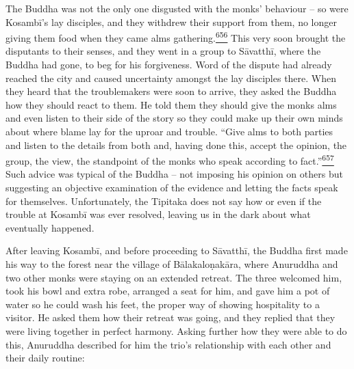 The Buddha was not the only one disgusted with the monks' behaviour --
so were Kosambī's lay disciples, and they withdrew their support from
them, no longer giving them food when they came alms
gathering.\label{footprints_split_016.html_fnref656}\hyperref[footprints_split_025.htmlux5cux23fn656]{\textsuperscript{656}}
This very soon brought the disputants to their senses, and they went in
a group to Sāvatthī, where the Buddha had gone, to beg for his
forgiveness. Word of the dispute had already reached the city and caused
uncertainty amongst the lay disciples there. When they heard that the
troublemakers were soon to arrive, they asked the Buddha how they should
react to them. He told them they should give the monks alms and even
listen to their side of the story so they could make up their own minds
about where blame lay for the uproar and trouble. ``Give alms to both
parties and listen to the details from both and, having done this,
accept the opinion, the group, the view, the standpoint of the monks who
speak according to
fact.''\label{footprints_split_016.html_fnref657}\hyperref[footprints_split_025.htmlux5cux23fn657]{\textsuperscript{657}}
Such advice was typical of the Buddha -- not imposing his opinion on
others but suggesting an objective examination of the evidence and
letting the facts speak for themselves. Unfortunately, the Tipitaka does
not say how or even if the trouble at Kosambī was ever resolved, leaving
us in the dark about what eventually happened.

After leaving Kosambī, and before proceeding to Sāvatthī, the Buddha
first made his way to the forest near the village of Bālakaloṇakāra,
where Anuruddha and two other monks were staying on an extended retreat.
The three welcomed him, took his bowl and extra robe, arranged a seat
for him, and gave him a pot of water so he could wash his feet, the
proper way of showing hospitality to a visitor. He asked them how their
retreat was going, and they replied that they were living together in
perfect harmony. Asking further how they were able to do this, Anuruddha
described for him the trio's relationship with each other and their
daily routine:

